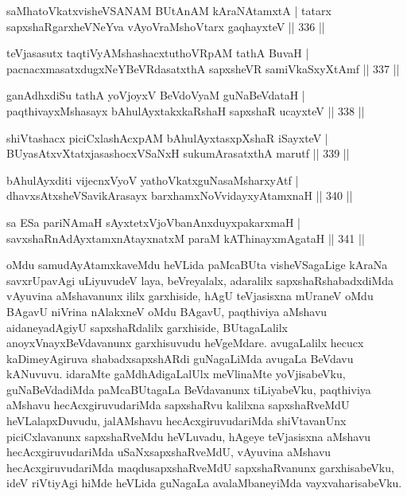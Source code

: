 \begin{shl}
saMhatoVkatxvisheVSANAM BUtAnAM kAraNAtamxtA |
tatarx sapxshaRgarxheVNeYva vAyoVraMshoV\s tarx gaqhayxteV \hfill || 336 ||
\end{shl}

\begin{shl}
teVjasasutx taqtiVyAMshashacxtuthoVR\s pAM tathA BuvaH |
pacnacxmasatxdugxNeYBeVRdasatxthA sapxsheVR samiVkaSxyXtAmf \hfill || 337 ||
\end{shl}

\begin{shl}
ganAdhxdiSu tathA yoVjoyxV BeVdoV\s yaM guNaBeVdataH |
paqthivayxMshasayx bAhulAyxtakxkaRshaH sapxshaR ucayxteV \hfill || 338 ||
\end{shl}

\begin{shl}
shiVtashacx piciCxlashAcxpAM bAhulAyxtasxpXshaR iSayxteV |
BUyasAtxvXtatxjasashocxVSaNxH sukumArasatxthA marutf \hfill || 339 ||
\end{shl}

\begin{shl}
bAhulAyxditi vijecnxVyoV yathoVkatxguNasaMsharxyAtf |
dhavxsAtxsheVSavikArasayx barxhamxNoV\s vidayxyA\s \s tamxnaH \hfill || 340 ||
\end{shl}

\begin{shl}
sa ESa pariNAmaH sAyxtetxVjoVbanAnxduyxpakarxmaH |
savxshaRnAdAyxtamxnA\s tayxnatxM paraM kAThinayxmAgataH \hfill || 341 ||
\end{shl}

\begin{artha}
oMdu samudAyAtamxkaveMdu heVLida paMcaBUta visheVSagaLige kAraNa  savxrUpavAgi uLiyuvudeV laya, beVreyalalx, adaralilx \footnotemark[1]sapxshaRshabadxdiMda vAyuvina aMshavanunx ililx garxhiside, hAgU teVjasisxna mUraneV oMdu BAgavU niVrina nAlakxneV oMdu BAgavU, paqthiviya aMshavu aidaneyadAgiyU sapxshaRdalilx garxhiside, BUtagaLalilx anoyxVnayxBeVdavanunx garxhisuvudu heVgeMdare. avugaLalilx hecucx kaDimeyAgiruva shabadxsapxshARdi guNagaLiMda avugaLa BeVdavu kANuvuvu. idaraMte gaMdhAdigaLalUlx meVlinaMte yoVjisabeVku, guNaBeVdadiMda paMcaBUtagaLa BeVdavanunx tiLiyabeVku, paqthiviya aMshavu hecAcxgiruvudariMda sapxshaRvu kalilxna sapxshaRveMdU heVLalapxDuvudu, jalAMshavu hecAcxgiruvudariMda shiVtavanUnx piciCxlavanunx sapxshaRveMdu heVLuvadu, hAgeye teVjasisxna aMshavu hecAcxgiruvudariMda uSaNxsapxshaRveMdU, vAyuvina aMshavu hecAcxgiruvudariMda maqdusapxshaRveMdU sapxshaRvanunx garxhisabeVku, ideV riVtiyAgi hiMde heVLida guNagaLa avalaMbaneyiMda vayxvaharisabeVku.	
\end{artha}

